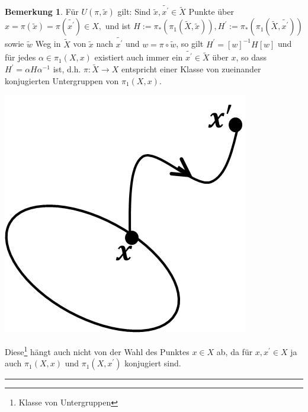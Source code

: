 \documentclass[a4paper,11pt,notitlepage]{report}
\theoremstyle{definition}
\newtheorem{remark}{Bemerkung}[chapter]
\begin{document}
\begin{remark}
	Für $U(\pi, \widetilde{x})$ gilt:
	\newline
	Sind $\widetilde{x}, \widetilde{x^\prime} \in \widetilde{X}$ Punkte über $x = \pi(\widetilde{x}) = \pi(\widetilde{x^\prime}) \in X,$ und ist $H:=\pi_*(\pi_1(\widetilde{X},\widetilde{x})), H^\prime:= \pi_*(\pi_1(\widetilde{X},\widetilde{x^\prime}))$ sowie $\widetilde{w}$ Weg in $\widetilde{X}$ von $\widetilde{x}$ nach $\widetilde{x^\prime}$ und $w = \pi \circ \widetilde{w}$, so gilt $\boxed{H^\prime = [w]^{-1} H [w]}$ und für jedes $\alpha \in \pi_1(X,x)$ existiert auch immer ein $\widetilde{x^\prime} \in \widetilde{X}$ über $x$, so dass $H^\prime = \alpha H \alpha^{-1}$ ist, d.h. $\pi \colon \widetilde{X} \rightarrow X$ entspricht einer Klasse von zueinander konjugierten Untergruppen von $\pi_1(X,x)$. \begin{center}
	 	\includegraphics[scale=0.5]{images/2011_12_20_Bild2.jpg}
	 \end{center}
	Diese\footnote{Klasse von Untergruppen} hängt auch nicht von der Wahl des Punktes $x \in X$ ab, da für $x, x^\prime \in X$ ja auch $\pi_1(X,x)$ und $\pi_1(X,x^\prime)$ konjugiert sind.
\end{remark}	
\hrule
\end{document}
